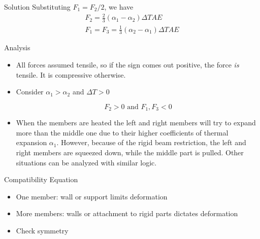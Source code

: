 \documentclass[10pt, svgnames]{beamer}
\begin{document}
\begin{frame}[label={sec:org3c229a6}]{Solution}
Substituting \(F_1 = F_2 / 2\), we have
\begin{gather*}
F_2 = \frac{2}{3} \left( \alpha_1 - \alpha_2 \right) \Delta T A E \\
F_1 = F_3 = \frac{1}{3} \left( \alpha_2 - \alpha_1 \right) \Delta T A E
\end{gather*}
\end{frame}

\begin{frame}[label={sec:org0fd4909}]{Analysis}
\begin{itemize}
\item All forces assumed tensile, so if the sign comes out positive, the force \emph{is} tensile. It is compressive otherwise.

\item Consider \(\alpha_1 > \alpha_2\) and \(\Delta T > 0\)

$$ F_2 > 0 \text{ and } F_1, F_3 < 0 $$

\item When the members are heated the left and right members will try to expand more than the middle one due to their higher coefficients of thermal expansion \(\alpha_1\). However, because of the rigid beam restriction, the left and right members are squeezed down, while the middle part is pulled. Other situations can be analyzed with similar logic.
\end{itemize}
\end{frame}

\begin{frame}[label={sec:org6260b7c}]{Compatibility Equation}
\begin{itemize}
\item One member: wall or support limits deformation

\item More members: walls or attachment to rigid parts dictates deformation

\item Check symmetry
\end{itemize}
\end{frame}
\end{document}
